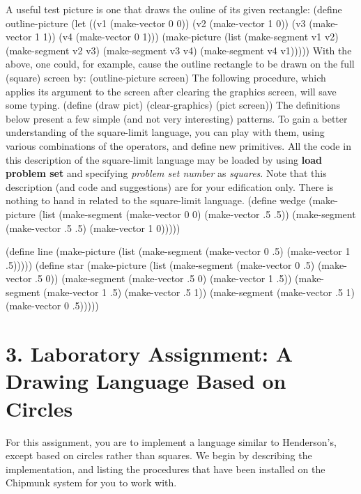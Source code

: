 A useful test picture is one that draws the ouline of its given
rectangle: 
\beginlisp
(define outline-picture
  (let ((v1 (make-vector 0 0))
        (v2 (make-vector 1 0))
        (v3 (make-vector 1 1))
        (v4 (make-vector 0 1)))
    (make-picture (list (make-segment v1 v2)
                        (make-segment v2 v3)
                        (make-segment v3 v4)
                        (make-segment v4 v1)))))
\endlisp
With the above, one could, for example, cause the outline rectangle to
be drawn on the full (square) screen by:
\beginlisp
(outline-picture screen)
\endlisp
The following procedure, which applies its argument to the screen after
clearing the graphics screen, will save some typing.
\beginlisp
(define (draw pict)
  (clear-graphics)
  (pict screen))
\endlisp
The definitions below present a few simple (and not very interesting)
patterns.  To gain a better understanding of the square-limit language,
you can play with them, using various combinations of the
operators, and define new primitives.
All the code in this description of the square-limit language may be
loaded by using {\bf load problem set} and specifying {\it problem set number}
as {\it squares}.  Note that this description (and code and suggestions)
are for your edification only.  There is nothing to hand in related to
the square-limit language.
\beginlisp
(define wedge (make-picture
               (list (make-segment (make-vector 0 0)
                                   (make-vector .5 .5))
                     (make-segment (make-vector .5 .5)
                                   (make-vector 1 0)))))

\pbrk
(define line (make-picture
              (list (make-segment (make-vector 0 .5)
                                  (make-vector 1 .5)))))
\pbrk
(define star (make-picture
              (list (make-segment (make-vector 0 .5)
                                  (make-vector .5 0))
                    (make-segment (make-vector .5 0)
                                  (make-vector 1 .5))
                    (make-segment (make-vector 1 .5)
                                  (make-vector .5 1))
                    (make-segment (make-vector .5 1)
                                  (make-vector 0 .5)))))
\endlisp

\chapter{3. Laboratory Assignment: A Drawing Language Based on Circles}

For this assignment, you are to implement a language similar to
Henderson's, except based on circles rather than squares.  We begin
by describing the implementation, and listing the procedures that have
been installed on the Chipmunk system for you to work with.


